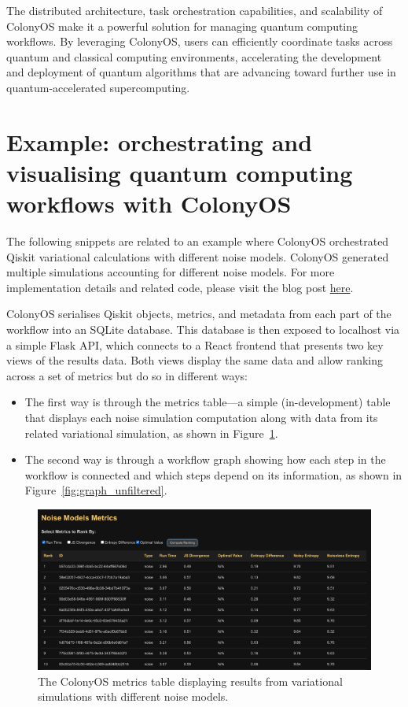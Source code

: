 \documentclass{article}
\begin{document}
The distributed architecture, task orchestration capabilities, and scalability of ColonyOS make it a powerful solution for managing quantum computing workflows. By leveraging ColonyOS, users can efficiently coordinate tasks across quantum and classical computing environments, accelerating the development and deployment of quantum algorithms that are advancing toward further use in quantum-accelerated supercomputing.

\section{Example: orchestrating and visualising quantum computing workflows with ColonyOS}\label{sec:example}

The following snippets are related to an example where ColonyOS orchestrated Qiskit variational calculations with different noise models. ColonyOS generated multiple simulations accounting for different noise models. For more implementation details and related code, please visit the blog post \href{https://www.ekprojectjournal.com/doku.php?id=projects:quantum:distributed}{here}.

ColonyOS serialises Qiskit objects, metrics, and metadata from each part of the workflow into an SQLite database. This database is then exposed to localhost via a simple Flask API, which connects to a React frontend that presents two key views of the results data. Both views display the same data and allow ranking across a set of metrics but do so in different ways:
\begin{itemize}
    \item The first way is through the metrics table---a simple (in-development) table that displays each noise simulation computation along with data from its related variational simulation, as shown in Figure~\ref{fig:metrics_table}.
    \item The second way is through a workflow graph showing how each step in the workflow is connected and which steps depend on its information, as shown in Figure~\ref{fig:graph_unfiltered}.
\end{itemize}

\begin{figure}[htbp]
    \centering
    \includegraphics[width=1.0\linewidth]{img/metrics_table.png}
    \caption{The ColonyOS metrics table displaying results from variational simulations with different noise models.}
    \label{fig:metrics_table}
\end{figure}
\end{document}
